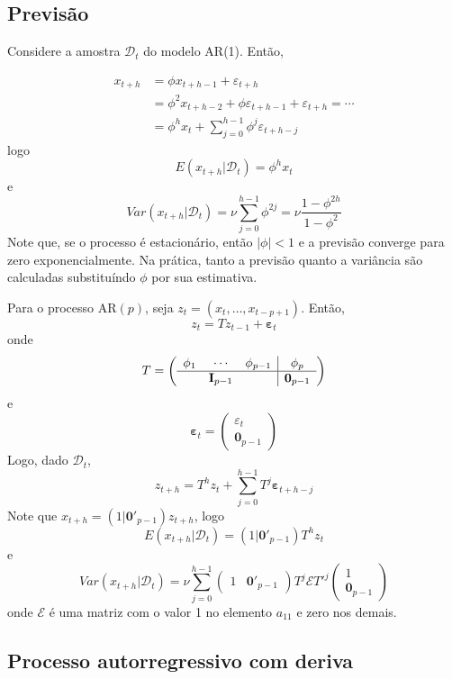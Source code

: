 \documentclass[
  letterpaper,
  DIV=11,
  numbers=noendperiod]{scrartcl}
\theoremstyle{definition}
\theoremstyle{definition}
\theoremstyle{plain}
\theoremstyle{plain}
\theoremstyle{remark}
\begin{document}
\subsection{Previsão}\label{previsuxe3o-1}

Considere a amostra \(\mathcal{D}_t\) do modelo AR(1). Então,

\begin{align}x_{t+h}&=\phi x_{t+h-1}+\varepsilon_{t+h}\\ &=\phi^2x_{t+h-2}+\phi\varepsilon_{t+h-1}+\varepsilon_{t+h}= \cdots\\&=\phi^h x_t+\sum_{j=0}^{h-1}\phi^j\varepsilon_{t+h-j}\end{align}
logo \[E(x_{t+h}|\mathcal{D}_t)=\phi^h x_t\] e
\[Var(x_{t+h}|\mathcal{D}_t)=\nu\sum_{j=0}^{h-1}\phi^{2j}=\nu\frac{1-\phi^{2h}}{1-\phi^2}\]
Note que, se o processo é estacionário, então \(|\phi|<1\) e a previsão
converge para zero exponencialmente. Na prática, tanto a previsão quanto
a variância são calculadas substituíndo \(\phi\) por sua estimativa.

Para o processo AR\((p)\), seja \(z_t=(x_t,\ldots,x_{t-p+1})\). Então,
\[z_t=Tz_{t-1}+\boldsymbol{\varepsilon}_t\] onde
\[T=\left(\begin{array}{ccc|c}\phi_1&\cdots&\phi_{p-1} & \phi_p \\ \hline & \textbf{I}_{p-1} & & \textbf{0}_{p-1}\end{array}\right)\]
e
\[\boldsymbol{\varepsilon}_t=\left(\begin{array}{c}\varepsilon_t \\ \hline \textbf{0}_{p-1}\end{array}\right)\]
Logo, dado \(\mathcal{D}_t\),
\[z_{t+h}=T^h z_t+\sum_{j=0}^{h-1}T^j\boldsymbol{\varepsilon}_{t+h-j}\]
Note que \(x_{t+h}=(1|\textbf{0}'_{p-1})z_{t+h}\), logo
\[E(x_{t+h}|\mathcal{D}_t)=(1|\textbf{0}'_{p-1})T^h z_t\] e
\[Var(x_{t+h}|\mathcal{D}_t)=\nu\sum_{j=0}^{h-1}\left(\begin{array}{c|c}1&\textbf{0}'_{p-1}\end{array}\right)T^j \mathcal{E} T'^j\left(\begin{array}{c}1 \\ \hline \textbf{0}_{p-1}\end{array}\right) \]
onde \(\mathcal{E}\) é uma matriz com o valor 1 no elemento \(a_{11}\) e
zero nos demais.

\subsection{Processo autorregressivo com
deriva}\label{processo-autorregressivo-com-deriva}
\end{document}
